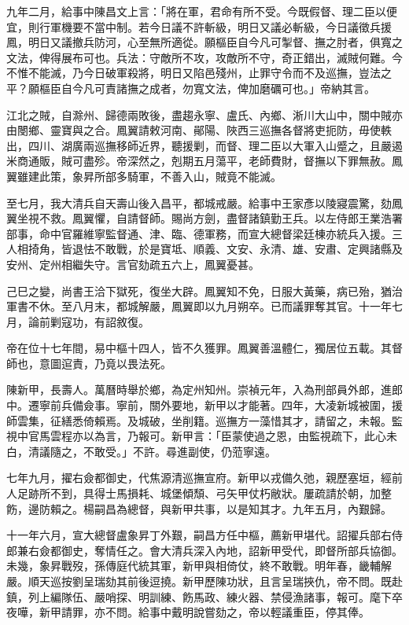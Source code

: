 \begin{pinyinscope}
九年二月，給事中陳昌文上言：「將在軍，君命有所不受。今既假督、理二臣以便宜，則行軍機要不當中制。若今日議不許斬級，明日又議必斬級，今日議徵兵援鳳，明日又議撤兵防河，心至無所適從。願樞臣自今凡可掣督、撫之肘者，俱寬之文法，俾得展布可也。兵法：守敵所不攻，攻敵所不守，奇正錯出，滅賊何難。今不惟不能滅，乃今日破軍殺將，明日又陷邑殘州，止罪守令而不及巡撫，豈法之平？願樞臣自今凡可責諸撫之成者，勿寬文法，俾加磨礪可也。」帝納其言。

江北之賊，自滁州、歸德兩敗後，盡趨永寧、盧氏、內鄉、淅川大山中，關中賊亦由閿鄉、靈寶與之合。鳳翼請敕河南、鄖陽、陜西三巡撫各督將吏扼防，毋使軼出，四川、湖廣兩巡撫移師近界，聽援剿，而督、理二臣以大軍入山蹙之，且嚴遏米商通販，賊可盡殄。帝深然之，剋期五月蕩平，老師費財，督撫以下罪無赦。鳳翼雖建此策，象昇所部多騎軍，不善入山，賊竟不能滅。

至七月，我大清兵自天壽山後入昌平，都城戒嚴。給事中王家彥以陵寢震驚，劾鳳翼坐視不救。鳳翼懼，自請督師。賜尚方劍，盡督諸鎮勤王兵。以左侍郎王業浩署部事，命中官羅維寧監督通、津、臨、德軍務，而宣大總督梁廷棟亦統兵入援。三人相掎角，皆退怯不敢戰，於是寶坻、順義、文安、永清、雄、安肅、定興諸縣及安州、定州相繼失守。言官劾疏五六上，鳳翼憂甚。

己巳之變，尚書王洽下獄死，復坐大辟。鳳翼知不免，日服大黃藥，病已殆，猶治軍書不休。至八月末，都城解嚴，鳳翼即以九月朔卒。已而議罪奪其官。十一年七月，論前剿寇功，有詔敘復。

帝在位十七年間，易中樞十四人，皆不久獲罪。鳳翼善溫體仁，獨居位五載。其督師也，意圖逭責，乃竟以畏法死。

陳新甲，長壽人。萬曆時舉於鄉，為定州知州。崇禎元年，入為刑部員外郎，進郎中。遷寧前兵備僉事。寧前，關外要地，新甲以才能著。四年，大凌新城被圍，援師雲集，征繕悉倚賴焉。及城破，坐削籍。巡撫方一藻惜其才，請留之，未報。監視中官馬雲程亦以為言，乃報可。新甲言：「臣蒙使過之恩，由監視疏下，此心未白，清議隨之，不敢受。」不許。尋進副使，仍蒞寧遠。

七年九月，擢右僉都御史，代焦源清巡撫宣府。新甲以戎備久弛，親歷塞垣，經前人足跡所不到，具得士馬損耗、城堡傾頹、弓矢甲仗朽敝狀。屢疏請於朝，加整飭，邊防賴之。楊嗣昌為總督，與新甲共事，以是知其才。九年五月，內艱歸。

十一年六月，宣大總督盧象昇丁外艱，嗣昌方任中樞，薦新甲堪代。詔擢兵部右侍郎兼右僉都御史，奪情任之。會大清兵深入內地，詔新甲受代，即督所部兵協御。未幾，象昇戰歿，孫傳庭代統其軍，新甲與相倚仗，終不敢戰。明年春，畿輔解嚴。順天巡按劉呈瑞劾其前後逗撓。新甲歷陳功狀，且言呈瑞挾仇，帝不問。既赴鎮，列上編隊伍、嚴哨探、明訓練、飭馬政、練火器、禁侵漁諸事，報可。麾下卒夜嘩，新甲請罪，亦不問。給事中戴明說嘗劾之，帝以輕議重臣，停其俸。


\end{pinyinscope}
